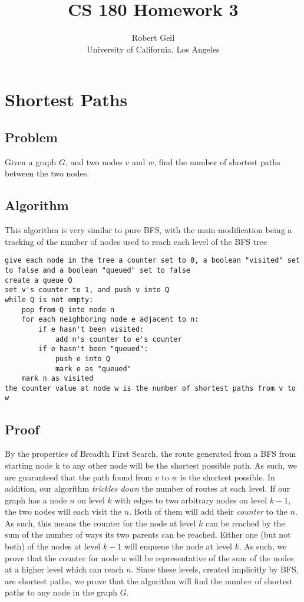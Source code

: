 \documentclass[titlepage]{article}
\title{CS 180 Homework 3}
\author{Robert Geil \\
University of California, Los Angeles
}
\numberwithin{equation}{subsection}
\begin{document}
\maketitle
\section{Shortest Paths}
\subsection{Problem}
Given a graph $G$, and two nodes $v$ and $w$, find the number of
shortest paths between the two nodes.
\subsection{Algorithm}
This algorithm is very similar to pure BFS, with
the main modification being a tracking of the number of
nodes used to reach each level of the BFS tree
\begin{lstlisting}
give each node in the tree a counter set to 0, a boolean "visited" set to false and a boolean "queued" set to false
create a queue Q
set v's counter to 1, and push v into Q
while Q is not empty:
    pop from Q into node n
    for each neighboring node e adjacent to n:
        if e hasn't been visited:
            add n's counter to e's counter
        if e hasn't been "queued":
            push e into Q
            mark e as "queued"
    mark n as visited
the counter value at node w is the number of shortest paths from v to w
\end{lstlisting}
\subsection{Proof}
By the properties of Breadth First Search, the route generated from a
BFS from starting node k to any other node will be the shortest
possible path. As such, we are guaranteed that the path found from
$v$ to $w$ is the shortest possible. In addition, our algorithm
\textit{trickles down} the number of routes at each level. If our
graph has a node $n$ on level $k$ with edges to two arbitrary nodes on
level $k-1$, the two nodes will each visit the $n$. Both of
them will add their \textit{counter} to the $n$. As such,
this means the counter for the node at level $k$ can be reached
by the sum of the number of ways its two parents can be reached.
Either one (but not both) of the nodes at level $k-1$ will 
enqueue the node at level $k$. As such, we prove that the counter for
node $n$ will be representative of the sum of the nodes at a higher
level which can reach $n$. Since these levels, created implicitly by BFS,
are shortest paths, we prove that the algorithm will find the
number of shortest paths to any node in the graph $G$.
\end{document}
